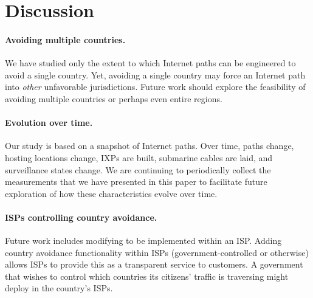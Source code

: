 \section{Discussion}
\label{sec:discussion}

\paragraph{Avoiding multiple countries.} 
We have studied only the extent to which Internet paths can be
engineered to avoid a {single} country.  Yet, avoiding a single country
may force an Internet path into {\em other} unfavorable
jurisdictions. Future work should
explore the feasibility of avoiding multiple countries or perhaps even entire regions.


\paragraph{Evolution over time.}
Our study is based on a snapshot of Internet paths. Over time, paths
change, hosting locations change, IXPs are built, submarine cables are
laid, and surveillance states change.  We are continuing to periodically collect
the measurements that we have presented in this paper to facilitate future exploration
of how these characteristics evolve over time.


\paragraph{ISPs controlling country avoidance.} 
Future work includes modifying \system{} to be implemented within an 
ISP.  Adding country avoidance functionality within ISPs 
(government-controlled or otherwise) allows ISPs to provide this as a transparent
service to customers.  A government that wishes to control which countries
its citizens' traffic is traversing might deploy \system{} in the country's ISPs.

